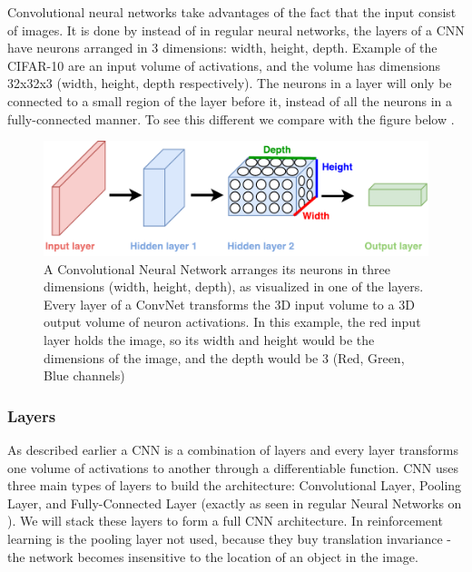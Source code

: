 Convolutional neural networks take advantages of the fact that the input consist of images. It is done by instead of in regular neural networks, the layers of a CNN have neurons arranged in 3 dimensions: width, height, depth. Example of the CIFAR-10 are an input volume of activations, and the volume has dimensions 32x32x3 (width, height, depth respectively). The neurons in a layer will only be connected to a small region of the layer before it, instead of all the neurons in a fully-connected manner. To see this different we compare  with the figure below .    

\begin{figure}[H]
	\centering
	\includegraphics[width=1\textwidth]{Figures/NN_vs_CNN.pdf}
	\caption{A Convolutional Neural Network arranges its neurons in three dimensions (width, height, depth), as visualized in one of the layers. Every layer of a ConvNet transforms the 3D input volume to a 3D output volume of neuron activations. In this example, the red input layer holds the image, so its width and height would be the dimensions of the image, and the depth would be 3 (Red, Green, Blue channels) \cite{CNN_course}}
	\label{fig:NN_vs_CNN}
\end{figure}

\subsubsection{Layers}
As described earlier a CNN is a combination of layers and every layer transforms one volume of activations to another through a differentiable function. CNN uses three main types of layers to build the architecture: Convolutional Layer, Pooling Layer, and Fully-Connected Layer (exactly as seen in regular Neural Networks on ). We will stack these layers to form a full CNN architecture. In reinforcement learning is the pooling layer not used, because they buy translation invariance - the network becomes insensitive to the location of an object in the image.

